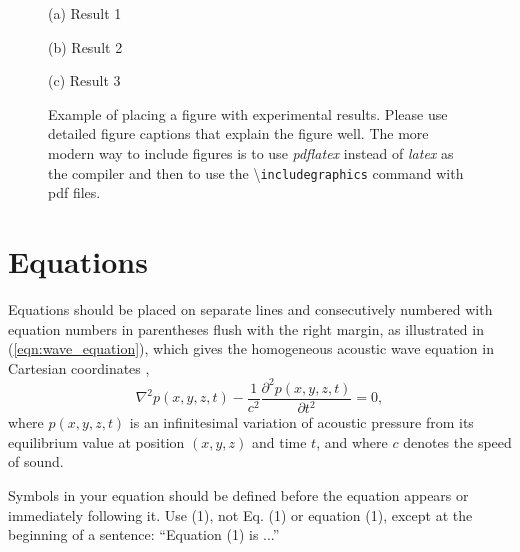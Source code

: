 \documentclass[a4paper,10pt,oneside]{article}
\begin{document}
\begin{sloppy}
\begin{figure}[th]
\begin{minipage}[h]{1.0\columnwidth}
  \centering
  \centerline{}
  \centerline{(a) Result 1}\medskip
\end{minipage}
\begin{minipage}[h]{0.48\columnwidth}
  \centering
  \centerline{}
  \centerline{(b) Result 2}\medskip
\end{minipage}
\hfill
\begin{minipage}[h]{0.48\columnwidth}
  \centering
  \centerline{}
  \centerline{(c) Result 3}\medskip
\end{minipage}
\caption{Example of placing a figure with experimental results. Please use detailed figure captions that explain the figure well. The more modern way to include figures is to use \emph{pdflatex} instead of \emph{latex} as the compiler and then to use 
the \textbackslash\texttt{includegraphics} command with pdf files.}
\label{fig:results}
%
\end{figure}

\section{Equations}
\label{sec:equations}

Equations should be placed on separate lines and consecutively numbered with equation numbers in parentheses flush with the right margin, as illustrated in (\ref{eqn:wave_equation}), which gives the homogeneous acoustic wave equation in Cartesian coordinates \cite{eWilliams1999},
\begin{equation}
  \label{eqn:wave_equation}
    \nabla^2p(x,y,z,t)-
    \displaystyle\frac{1}{c^2}\frac{\partial^2p(x,y,z,t)}{\partial t^2}=0,
\end{equation}
where $p(x,y,z,t)$ is an infinitesimal variation of acoustic pressure from its equilibrium value at position $(x,y,z)$ and time $t$, and where $c$ denotes the speed of sound.

Symbols in your equation should be defined before the equation appears or immediately following it. Use (1), not Eq. (1) or equation (1), except at the beginning of a sentence: ``Equation (1) is ...''


\end{sloppy}
\end{document}
